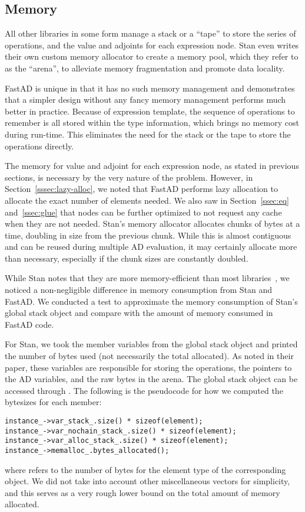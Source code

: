 \subsection{Memory} 

All other libraries in some form manage a stack or a ``tape''
to store the series of operations, and
the value and adjoints for each expression node.
Stan even writes their own custom memory allocator to create a memory pool,
which they refer to as the ``arena'', to alleviate memory fragmentation
and promote data locality.

FastAD is unique in that it has no such memory management and
demonstrates that a simpler design without any fancy memory management 
performs much better in practice.
Because of expression template, the sequence of operations to remember
is all stored within the type information, which brings no memory cost during run-time.
This eliminates the need for the stack or the tape to store the operations directly.

The memory for value and adjoint for each expression node, as stated in previous sections,
is necessary by the very nature of the problem.
However, in Section~\ref{sssec:lazy-alloc}, we noted that FastAD
performs lazy allocation to allocate the exact number of elements needed.
We also saw in Section~\ref{ssec:eq} and~\ref{ssec:glue} that nodes can be further optimized
to not request any cache when they are not needed.
Stan's memory allocator allocates chunks of bytes at a time, doubling in size from the previous chunk.
While this is almost contiguous and can be reused during multiple AD evaluation,
it may certainly allocate more than necessary, especially if the chunk sizes are constantly doubled.

While Stan notes that they are more memory-efficient than most libraries~\cite{carpenter:2015},
we noticed a non-negligible difference in memory consumption from Stan and FastAD.
We conducted a test to approximate the memory consumption of Stan's global stack object
and compare with the amount of memory consumed in FastAD code.

For Stan, we took the member variables
from the global stack object and printed the number of bytes used 
(not necessarily the total allocated).
As noted in their paper, these variables are responsible for storing
the operations, the pointers to the AD variables, and the raw bytes in the arena.
The global stack object can be accessed through .
The following is the pseudocode for how we computed the bytesizes for each member:
\begin{lstlisting}[style=customcpp]
instance_->var_stack_.size() * sizeof(element);
instance_->var_nochain_stack_.size() * sizeof(element);
instance_->var_alloc_stack_.size() * sizeof(element);
instance_->memalloc_.bytes_allocated();
\end{lstlisting}
where  refers to the number of bytes 
for the element type of the corresponding  object.
We did not take into account other miscellaneous vectors for simplicity,
and this serves as a very rough lower bound on the total amount of memory allocated.

